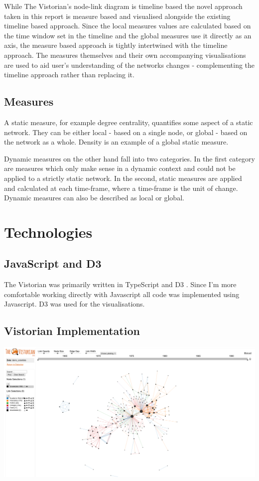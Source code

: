 While The Vistorian's node-link diagram is timeline based the novel approach taken in this report is measure based and visualised alongside the existing timeline based approach. Since the local measures values are calculated based on the time window set in the timeline and the global measures use it directly as an axis, the measure based approach is tightly intertwined with the timeline approach. The measures themselves and their own accompanying visualisations are used to aid user's understanding of the networks changes - complementing the  timeline approach rather than replacing it.


\subsection{Measures}
A static measure, for example degree centrality, quantifies some aspect of a static network. They can be either local - based on a single node, or global - based on the network as a whole. Density is an example of a global static measure. 

Dynamic measures on the other hand fall into two categories. In the first category are measures which only make sense in a dynamic context and could not be applied to a strictly static network. In the second, static measures are applied and calculated at each time-frame, where a time-frame is the unit of change. %
Dynamic measures can also be described as local or global.



\section{Technologies}
\subsection{JavaScript and D3}
\label{sec:sec24}
The Vistorian was primarily written in TypeScript and D3 \cite{d3site}. Since I'm more comfortable working directly with Javascript all code was implemented using Javascript. D3 was used for the visualisations.

\subsection{Vistorian Implementation}

\begin{center}
\includegraphics[trim={0 0 0 0}, width=140mm]{./Figures/vistorianOriginal.png}
\end{center}

